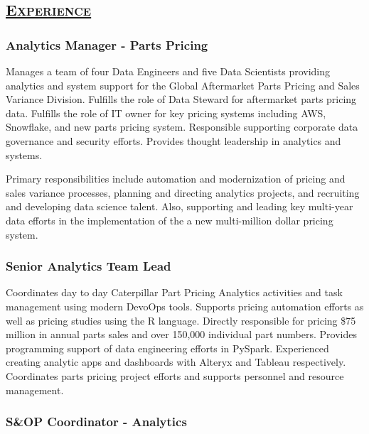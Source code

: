 \documentclass[
  letterpaper,
  DIV=11,
  numbers=noendperiod]{scrartcl}
\begin{document}
\hypertarget{experience}{%
\subsection{\texorpdfstring{\textsc{\ul{Experience}}}{Experience}}\label{experience}}

\hypertarget{analytics-manager---parts-pricing}{%
\subsubsection{Analytics Manager - Parts
Pricing}\label{analytics-manager---parts-pricing}}

Manages a team of four Data Engineers and five Data Scientists providing
analytics and system support for the Global Aftermarket Parts Pricing
and Sales Variance Division. Fulfills the role of Data Steward for
aftermarket parts pricing data. Fulfills the role of IT owner for key
pricing systems including AWS, Snowflake, and new parts pricing system.
Responsible supporting corporate data governance and security efforts.
Provides thought leadership in analytics and systems.

Primary responsibilities include automation and modernization of pricing
and sales variance processes, planning and directing analytics projects,
and recruiting and developing data science talent. Also, supporting and
leading key multi-year data efforts in the implementation of the a new
multi-million dollar pricing system.

\hypertarget{senior-analytics-team-lead}{%
\subsubsection{Senior Analytics Team
Lead}\label{senior-analytics-team-lead}}

Coordinates day to day Caterpillar Part Pricing Analytics activities and
task management using modern DevoOps tools. Supports pricing automation
efforts as well as pricing studies using the R language. Directly
responsible for pricing \$75 million in annual parts sales and over
150,000 individual part numbers. Provides programming support of data
engineering efforts in PySpark. Experienced creating analytic apps and
dashboards with Alteryx and Tableau respectively. Coordinates parts
pricing project efforts and supports personnel and resource management.

\hypertarget{sop-coordinator---analytics}{%
\subsubsection{S\&OP Coordinator -
Analytics}\label{sop-coordinator---analytics}}
\end{document}
